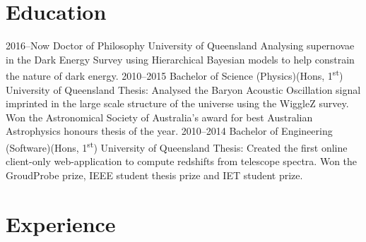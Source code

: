 \documentclass[]{friggeri-cv} %
\begin{document}





\section{Education}

\begin{entrylist}
\entry
{2016--Now}
{Doctor of Philosophy}
{University of Queensland}
{Analysing supernovae in the Dark Energy Survey using Hierarchical Bayesian models to help constrain the nature of dark energy.}
\entry
{2010--2015}
{Bachelor of Science {\normalfont (Physics)(Hons, 1\textsuperscript{st})}}
{University of Queensland}
{Thesis: Analysed the Baryon Acoustic Oscillation signal imprinted in the large scale structure of the universe using the WiggleZ survey. Won the Astronomical Society of Australia's award for best Australian Astrophysics honours thesis of the year.}
\entry
{2010--2014}
{Bachelor of Engineering {\normalfont (Software)(Hons, 1\textsuperscript{st})}}
{University of Queensland}
{Thesis: Created the first online client-only web-application to compute redshifts from telescope spectra. Won the GroudProbe prize, IEEE student thesis prize and IET student prize.}

\end{entrylist}

\section{Experience}
\end{document}

